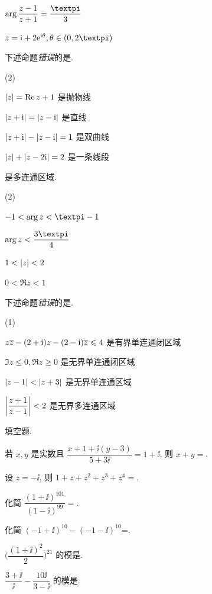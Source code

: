\begin{homework}
\begin{homework}
\begin{exchoice}
      \item $\arg\dfrac{z-1}{z+1}=\dfrac{\cpi}{3}$
      \item $z=\ii+2\ee^{\ii\theta},\theta\in(0,2\cpi)$
    \end{exchoice}
    \item 下述命题\emph{错误}的是\fillbrace{}.
    \begin{exchoice}(2)
      \item $\lvert z\rvert=\operatorname{Re} z+1$ 是抛物线
      \item $\lvert z+\mathrm{i}\rvert=\lvert z-\mathrm{i}\rvert$ 是直线
      \item $\lvert z+\mathrm{i}\rvert-\lvert z-\mathrm{i}\rvert=1$ 是双曲线
      \item $\lvert z\rvert+\lvert z-2\mathrm{i}\rvert=2$ 是一条线段
    \end{exchoice}
    \item \fillbrace{}是多连通区域.
    \begin{exchoice}(2)
      \item $-1<\arg z<\cpi-1$
      \item $\arg z<\dfrac{3\cpi}4$
      \item $1<\lvert z\rvert<2$
      \item $0<\Re z<1$
    \end{exchoice}
    \item 下述命题\emph{错误}的是\fillbrace{}.
    \begin{exchoice}(1)
      \item $z\overline z-(2+\mathrm{i})z-(2-\mathrm{i})\overline z\leqslant 4$ 是有界单连通闭区域
      \item $\Im z\le0,\Re z\ge0$ 是无界单连通闭区域
      \item $\lvert z-1\rvert<\lvert z+3\rvert$ 是无界单连通区域
      \item $\biggl\vert\dfrac{z+1}{z-1}\biggr\vert<2$ 是无界多连通区域
    \end{exchoice}
  \end{homework}
  \item 填空题.
  \begin{homework}
    \item 若 $x,y$ 是实数且 $\dfrac{x+1+\ii(y-3)}{5+3\ii}=1+\ii$, 则 $x+y=$\fillblank{}.
    \item 设 $z=-\ii$, 则 $1+z+z^2+z^3+z^4=$\fillblank{}.
    \item 化简 $\dfrac{(1+\ii)^{101}}{(1-\ii)^{99}}=$\fillblank{}.
    \item 化简 $(-1+\ii)^{10}-(-1-\ii)^{10}$=\fillblank{}.
    \item $\biggl(\dfrac{(1+\ii)^2}2\biggr)^{21}$ 的模是\fillblank{}.
    \item $\dfrac{3+\ii}{\ii}-\dfrac{10\ii}{3-\ii}$ 的模是\fillblank{}.

\end{homework}
\end{homework}
